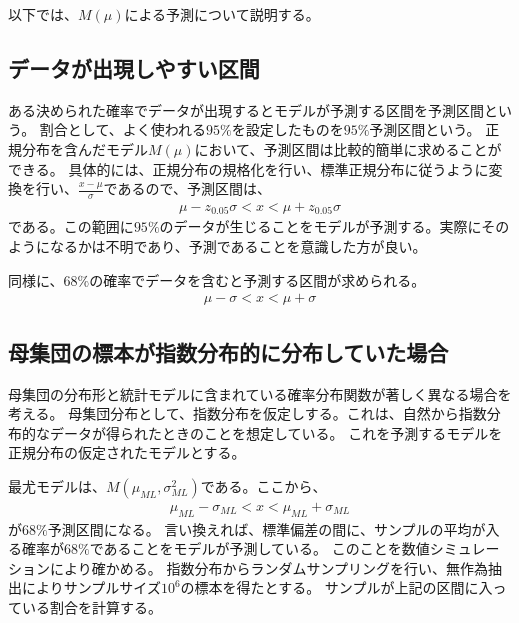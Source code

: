 以下では、$M(\mu)$による予測について説明する。


\subsection{データが出現しやすい区間}
ある決められた確率でデータが出現するとモデルが予測する区間を予測区間という。
割合として、よく使われる$95\%$を設定したものを$95\%$予測区間という。
正規分布を含んだモデル$M(\mu)$において、予測区間は比較的簡単に求めることができる。
具体的には、正規分布の規格化を行い、標準正規分布に従うように変換を行い、$\frac{x-\mu}{\sigma}$であるので、予測区間は、
\begin{eqnarray*}
    \mu-z_{0.05}\sigma < x < \mu+z_{0.05}\sigma
\end{eqnarray*}
である。この範囲に$95\%$のデータが生じることをモデルが予測する。実際にそのようになるかは不明であり、予測であることを意識した方が良い。

同様に、$68\%$の確率でデータを含むと予測する区間が求められる。
\begin{eqnarray*}
    \mu-\sigma < x < \mu+\sigma
\end{eqnarray*}





\subsection{母集団の標本が指数分布的に分布していた場合}
母集団の分布形と統計モデルに含まれている確率分布関数が著しく異なる場合を考える。
母集団分布として、指数分布を仮定しする。これは、自然から指数分布的なデータが得られたときのことを想定している。
これを予測するモデルを正規分布の仮定されたモデルとする。

最尤モデルは、$M(\mu_{ML},\sigma^2_{ML})$である。ここから、
\begin{eqnarray*}
    \mu_{ML}-\sigma_{ML} < x < \mu_{ML}+\sigma_{ML}
\end{eqnarray*}
が$68\%$予測区間になる。
言い換えれば、標準偏差の間に、サンプルの平均が入る確率が$68\%$であることをモデルが予測している。
このことを数値シミュレーションにより確かめる。
指数分布からランダムサンプリングを行い、無作為抽出によりサンプルサイズ$10^6$の標本を得たとする。
サンプルが上記の区間に入っている割合を計算する。

